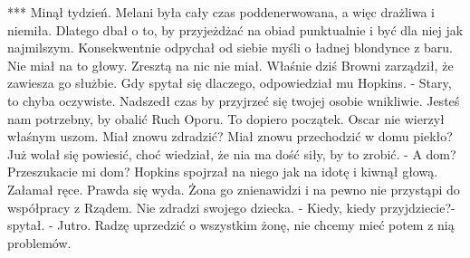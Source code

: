\documentclass[12pt,a4paper]{book}
\begin{document}
                                   ***
Minął tydzień. Melani była cały czas poddenerwowana, a więc drażliwa i niemiła. Dlatego dbał o to,  by przyjeżdżać na obiad punktualnie i być dla niej jak najmilszym. Konsekwentnie odpychał od siebie myśli o ładnej blondynce z baru. Nie miał na to głowy. Zresztą na nic nie miał. Właśnie dziś Browni zarządził, że zawiesza go służbie. Gdy spytał się dlaczego, odpowiedział mu Hopkins.
- Stary, to chyba oczywiste. Nadszedł czas by przyjrzeć się twojej osobie wnikliwie. Jesteś nam potrzebny, by obalić Ruch Oporu. To dopiero początek. 
Oscar nie wierzył właśnym uszom. Miał znowu zdradzić? Miał znowu przechodzić w domu piekło? Już wolał się powiesić, choć wiedział, że nia ma dość siły, by to zrobić. 
- A dom? Przeszukacie mi dom?
Hopkins spojrzał na niego jak na idotę i kiwnął głową. 
Załamał ręce. Prawda się wyda. Żona go znienawidzi i na pewno nie przystąpi do współpracy z Rządem. Nie zdradzi swojego dziecka. 
- Kiedy, kiedy przyjdziecie?- spytał.
- Jutro. Radzę uprzedzić o wszystkim żonę, nie chcemy mieć potem z nią problemów.
\end{document}
